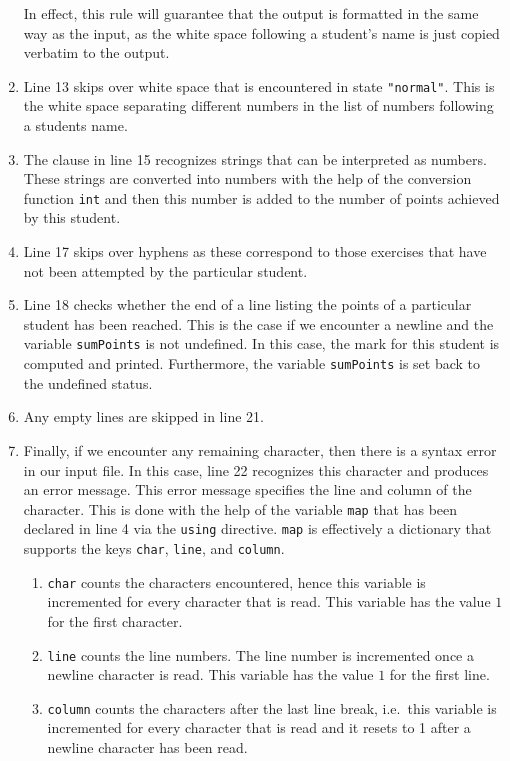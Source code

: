 \begin{enumerate}
      In effect, this rule will guarantee that the output is formatted in the same way as
      the input, as the white space following a student's name is just copied verbatim to the output.
\item Line 13 skips over white space that is encountered in state \texttt{"normal"}.
      This is the white space separating different numbers in the list of numbers following a
      students name.
\item The clause in line 15 recognizes strings that can be interpreted as numbers.  These
      strings are converted into numbers with the help of the conversion function \texttt{int} and
      then this number is added to the number of points achieved by this student.
\item Line 17 skips over hyphens as these correspond to those exercises that have not been attempted
      by the particular student.
\item Line 18 checks whether the end of a line listing the points of a particular student has been reached.
      This is the case if we encounter a newline and the variable \texttt{sumPoints}
      is not undefined.  In this case, the mark for this student is computed and printed.
      Furthermore, the variable \texttt{sumPoints} is set back to the undefined status.
\item Any empty lines are skipped in line 21.
\item Finally, if we encounter any remaining character, then there is a syntax error
      in our input file.  In this case, line 22 recognizes this character and
      produces an error message.  This error message
      specifies the line and column of the character.  This is done with the help of the
      variable \texttt{map} that has been declared in line 4 via the \texttt{using}
      directive.  \texttt{map} is effectively a dictionary that supports the keys \texttt{char},
      \texttt{line}, and \texttt{column}.  
      \begin{enumerate}
      \item \texttt{char} counts the characters encountered, hence this variable is incremented for 
            every character that is read.  This variable has the value $1$ for the first character.
      \item \texttt{line} counts the line numbers.  The line number is incremented once a newline
            character is read. This variable has the value $1$ for the first line.
      \item \texttt{column} counts the characters after the last line break, i.e.~this variable is incremented
            for every character that is read and it resets to 1 after a newline character has been read.
      \end{enumerate}
\end{enumerate}

